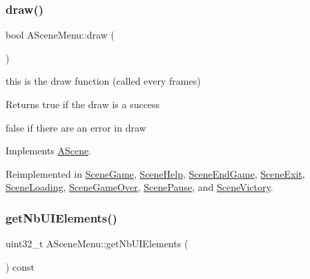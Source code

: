 \subsubsection{\texorpdfstring{draw()}{draw()}}
{\footnotesize\ttfamily bool A\+Scene\+Menu\+::draw (\begin{DoxyParamCaption}{ }\end{DoxyParamCaption})\hspace{0.3cm}{\ttfamily [virtual]}}



this is the draw function (called every frames) 

\begin{DoxyReturn}{Returns}
true if the draw is a success 

false if there are an error in draw 
\end{DoxyReturn}


Implements \hyperlink{class_a_scene_a7c303489d4c296482af38aa5deccbd8b}{A\+Scene}.



Reimplemented in \hyperlink{class_scene_game_a0797fee2de442f68aef19cc5c3299ec3}{Scene\+Game}, \hyperlink{class_scene_help_a8f6cc7a52fe41d06815ff10a9ac941a2}{Scene\+Help}, \hyperlink{class_scene_end_game_a145614d80f41512a5bcf539278555d0c}{Scene\+End\+Game}, \hyperlink{class_scene_exit_a3b7110e736f86836568fdb2f8a997877}{Scene\+Exit}, \hyperlink{class_scene_loading_ae51a1b4d4f738847d50036c174364f9e}{Scene\+Loading}, \hyperlink{class_scene_game_over_aa9c4f9d3cabdc89176c0113e2864f3e8}{Scene\+Game\+Over}, \hyperlink{class_scene_pause_aa59d21ea311bab5163574441f3960734}{Scene\+Pause}, and \hyperlink{class_scene_victory_ac79e3eadfb4bfafa8733888a1e86f57e}{Scene\+Victory}.

\mbox{\label{class_a_scene_menu_a13b29d13f531109e90428c6f14d50e05}} 
\subsubsection{\texorpdfstring{get\+Nb\+U\+I\+Elements()}{getNbUIElements()}}
{\footnotesize\ttfamily uint32\+\_\+t A\+Scene\+Menu\+::get\+Nb\+U\+I\+Elements (\begin{DoxyParamCaption}{ }\end{DoxyParamCaption}) const}



